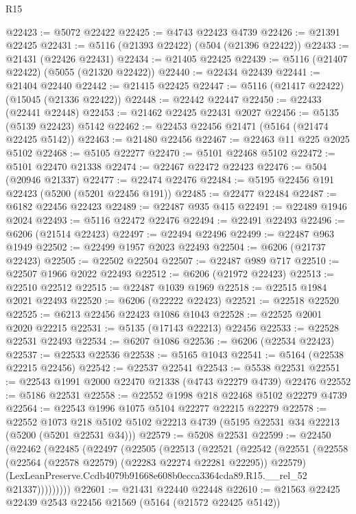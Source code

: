\begin{lexlean}{R15}
\begin{coremodule}
{{{{{{{{{{{@22423 := @5072 @22422
@22425 := @4743 @22423 @4739
@22426 := @21391 @22425
@22431 := @5116 (@21393 @22422) (@504 (@21396 @22422))
@22433 := @21431 (@22426 @22431)
@22434 := @21405 @22425
@22439 := @5116 (@21407 @22422) (@5055 (@21320 @22422))
@22440 := @22434 @22439
@22441 := @21404 @22440
@22442 := @21415 @22425
@22447 := @5116 (@21417 @22422) (@15045 (@21336 @22422))
@22448 := @22442 @22447
@22450 := @22433 (@22441 @22448)
@22453 := @21462 @22425 @22431 @2027
@22456 := @5135 (@5139 @22423) @5142
@22462 := @22453 @22456 @21471 (@5164 (@21474 @22425 @5142))
@22463 := @21480 @22456
@22467 := @22463 @11 @225 @2025 @5102
@22468 := @5105 @22277
@22470 := @5101 @22468 @5102
@22472 := @5101 @22470 @21338
@22474 := @22467 @22472 @22423
@22476 := @504 (@20946 @21337)
@22477 := @22474 @22476
@22484 := @5195 @22456 @191 @22423 (@5200 (@5201 @22456 @191))
@22485 := @22477 @22484
@22487 := @6182 @22456 @22423
@22489 := @22487 @935 @415
@22491 := @22489 @1946 @2024
@22493 := @5116 @22472 @22476
@22494 := @22491 @22493
@22496 := @6206 (@21514 @22423)
@22497 := @22494 @22496
@22499 := @22487 @963 @1949
@22502 := @22499 @1957 @2023 @22493
@22504 := @6206 (@21737 @22423)
@22505 := @22502 @22504
@22507 := @22487 @989 @717
@22510 := @22507 @1966 @2022 @22493
@22512 := @6206 (@21972 @22423)
@22513 := @22510 @22512
@22515 := @22487 @1039 @1969
@22518 := @22515 @1984 @2021 @22493
@22520 := @6206 (@22222 @22423)
@22521 := @22518 @22520
@22525 := @6213 @22456 @22423 @1086 @1043
@22528 := @22525 @2001 @2020 @22215
@22531 := @5135 (@17143 @22213) @22456
@22533 := @22528 @22531 @22493
@22534 := @6207 @1086
@22536 := @6206 (@22534 @22423)
@22537 := @22533 @22536
@22538 := @5165 @1043
@22541 := @5164 (@22538 @22215 @22456)
@22542 := @22537 @22541
@22543 := @5538 @22531
@22551 := @22543 @1991 @2000 @22470 @21338 (@4743 @22279 @4739) @22476
@22552 := @5186 @22531
@22558 := @22552 @1998 @218 @22468 @5102 @22279 @4739
@22564 := @22543 @1996 @1075 @5104 @22277 @22215 @22279
@22578 := @22552
    @1073
    @218
    @5102
    @5102
    @22213
    @4739
    (@5195 @22531 @34 @22213 (@5200 (@5201 @22531 @34)))
@22579 := @5208 @22531
@22599 := @22450
    (@22462
      (@22485
        (@22497
          (@22505
            (@22513
              (@22521
                (@22542
                  (@22551
                    (@22558 (@22564 (@22578 @22579) (@22283 @22274 @22281 @22295)) @22579)
                    (LexLeanPreserve.Ccdb4079b91668e608b0ecca3364cda89.R15.__rel_52 @21337)))))))))
@22601 := @21431 @22440 @22448
@22610 := @21563 @22425 @22439 @2543 @22456 @21569 (@5164 (@21572 @22425 @5142))
}}}}}}}}}}}
\end{coremodule}
\end{lexlean}
